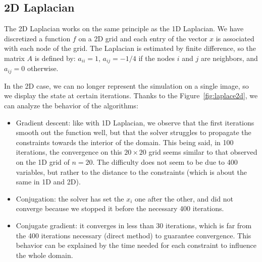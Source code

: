 \documentclass[notitlepage,oneside]{book}
\begin{document}
\subsection{2D Laplacian}

The 2D Laplacian works on the same principle as the 1D Laplacian.
We have discretized a function $f$ on a 2D grid and each entry of the vector $x$ is associated with each node of the grid.
The Laplacian is estimated by finite difference, so the matrix $A$ is defined by: $a_{ii}=1$, $a_{ij}=-1/4$ if the nodes $i$ and $j$ are neighbors, and $a_{ij}=0$ otherwise.

In the 2D case, we can no longer represent the simulation on a single image, so we display the state at certain iterations.
Thanks to the Figure~\ref{fig:laplace2d}, we can analyze the behavior of the algorithms:
\begin{itemize}
\item
Gradient descent: like with 1D Laplacian, we observe that the first iterations smooth out the function well, but that the solver struggles to propagate the constraints towards the interior of the domain.
This being said, in 100 iterations, the convergence on this $20\times 20$ grid seems similar to that observed on the 1D grid of $n=20$.
The difficulty does not seem to be due to 400 variables, but rather to the distance to the constraints (which is about the same in 1D and 2D).
\item Conjugation: the solver has set the $x_i$ one after the other, and did not converge because we stopped it before the necessary 400 iterations.
\item Conjugate gradient: it converges in less than 30 iterations, which is far from the 400 iterations necessary (direct method) to guarantee convergence.
This behavior can be explained by the time needed for each constraint to influence the whole domain.
\end{itemize}


%	
\end{document}

